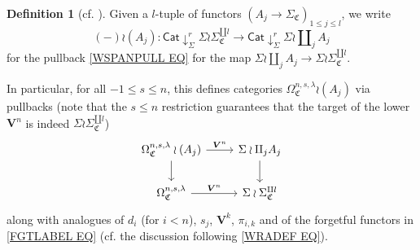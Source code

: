 \documentclass[a4paper,10pt
]{article}%
\numberwithin{equation}{section}
\numberwithin{figure}{section}
\theoremstyle{definition} %
\newtheorem{definition}[equation]{Definition}%
\newcommand{\1}{\ensuremath{\mathbbm 1}}%
\begin{document}
\begin{definition}[{cf. \cite[Not. 5.25]{BP21}}]
        \label{NA_DEF}
	Given a $l$-tuple of functors
	$\left(A_j \to \Sigma_{\mathfrak C} \right)_{1\leq j \leq l}$,
	we write
	\begin{equation}\label{WRAJDEF EQ}
	(-) \wr (A_j) \colon 
	\mathsf{Cat} \downarrow^r_{\Sigma} \Sigma \wr \Sigma_{\mathfrak{C}}^{\amalg l}
	\to
	\mathsf{Cat} \downarrow^r_{\Sigma} \Sigma \wr \amalg_j A_j
	\end{equation}
	for the pullback \eqref{WSPANPULL EQ} for the map
	$\Sigma \wr \amalg_j A_j \to \Sigma \wr \Sigma_{\mathfrak{C}}^{\amalg l}$.
	
	In particular, for all $-1\leq s \leq n$, this defines categories
	$\Omega^{n,s,\lambda}_{\mathfrak{C}} \wr (A_j)$ via pullbacks
	(note that the $s \leq n$ restriction guarantees that the target of the lower $\boldsymbol{V}^n$ is indeed $\Sigma \wr \Sigma_{\mathfrak{C}}^{\amalg l}$)
	\begin{equation}\label{WRAJSAMPLE EQ}
	\begin{tikzcd}
	\Omega^{n,s,\lambda}_{\mathfrak{C}} \wr (A_j) \ar{r}{\boldsymbol{V}^n} \ar{d} &
	\Sigma \wr \amalg_j A_j  \ar{d}
	\\
	\Omega^{n,s,\lambda}_{\mathfrak{C}} \ar{r}{\boldsymbol{V}^n} &
	\Sigma \wr \Sigma_{\mathfrak{C}}^{\amalg l}
	\end{tikzcd}
	\end{equation}
	along with analogues of $d_i$ (for $i<n$), $s_j$, $\boldsymbol{V}^k$, $\pi_{i,k}$
	and of the forgetful functors in \eqref{FGTLABEL EQ}
	(cf. the discussion following \eqref{WRADEF EQ}).
\end{definition}
\end{document}
